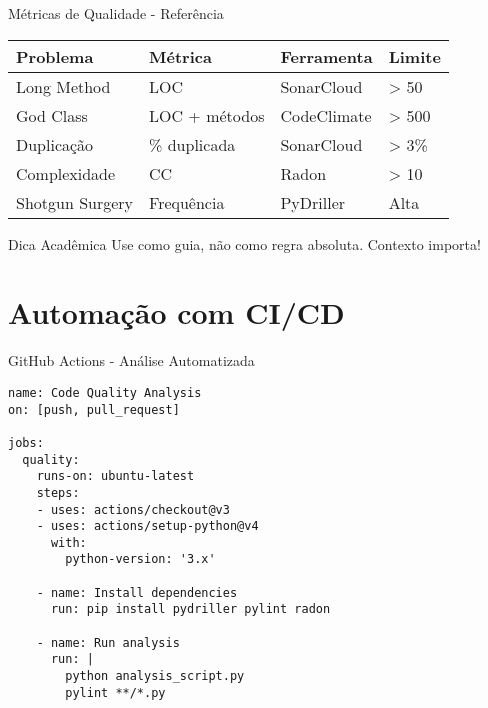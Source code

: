 \documentclass[aspectratio=169,11pt]{beamer}
\begin{document}
\begin{frame}{Métricas de Qualidade - Referência}
\begin{table}[]
\centering
\scriptsize
\begin{tabular}{|l|l|l|l|}
\hline
\textbf{Problema} & \textbf{Métrica} & \textbf{Ferramenta} & \textbf{Limite} \\ \hline
Long Method & LOC & SonarCloud & > 50 \\ \hline
God Class & LOC + métodos & CodeClimate & > 500 \\ \hline
Duplicação & \% duplicada & SonarCloud & > 3\% \\ \hline
Complexidade & CC & Radon & > 10 \\ \hline
Shotgun Surgery & Frequência & PyDriller & Alta \\ \hline
\end{tabular}
\end{table}

\begin{block}{ Dica Acadêmica}
Use como guia, não como regra absoluta. Contexto importa!
\end{block}
\end{frame}

\section{Automação com CI/CD}

\begin{frame}[fragile]{GitHub Actions - Análise Automatizada}
\begin{lstlisting}[style=yamlcode,basicstyle=\ttfamily\scriptsize]
name: Code Quality Analysis
on: [push, pull_request]

jobs:
  quality:
    runs-on: ubuntu-latest
    steps:
    - uses: actions/checkout@v3
    - uses: actions/setup-python@v4
      with:
        python-version: '3.x'
    
    - name: Install dependencies
      run: pip install pydriller pylint radon
    
    - name: Run analysis
      run: |
        python analysis_script.py
        pylint **/*.py
\end{lstlisting}
\end{frame}
\end{document}
